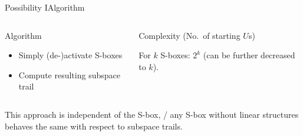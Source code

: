 \begin{frame}{Possibility I}{Algorithm}
    \begin{columns}[t,onlytextwidth]
        \begin{column}{0.5\textwidth}
            \begin{block}{Algorithm}
                \begin{minipage}[t][30pt][t]{\textwidth}
                \begin{itemize}
                    \item Simply (de-)activate S-boxes
                    \item Compute resulting subspace trail
                \end{itemize}
                \end{minipage}
            \end{block}
        \end{column}
        \begin{column}{0.4\textwidth}
            \begin{block}{Complexity (No.\ of starting $U$s)}
                \begin{minipage}[t][30pt][t]{\textwidth}
                \vspace*{0pt}
                For $k$ S-boxes: $2^k$ (can be further decreased to $k$).
                \end{minipage}
            \end{block}
        \end{column}
    \end{columns}
    \vspace{0.5em}
    This approach is independent of the S-box, \ie/ any S-box without linear structures behaves the same with respect to subspace trails.
\end{frame}

